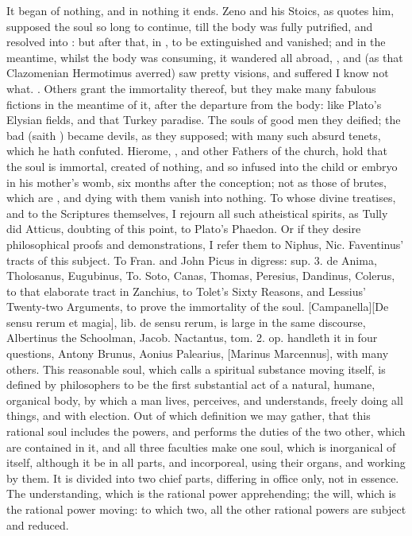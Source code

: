 {It began of nothing, and in nothing it ends. Zeno and his Stoics, as
\Austin{} quotes him, supposed the soul so long to continue, till
the body was fully putrified, and resolved into : but
after that, in , to be extinguished and vanished; and
in the meantime, whilst the body was consuming, it wandered all abroad,
, and (as that Clazomenian Hermotimus
averred) saw pretty visions, and suffered I know not what. .
Others grant the immortality thereof, but they make many fabulous
fictions in the meantime of it, after the departure from the body: like
Plato's Elysian fields, and that Turkey paradise. The souls of good men
they deified; the bad (saith \Austin{}) became devils, as they
supposed; with many such absurd tenets, which he hath confuted.
Hierome, \Austin{}, and other Fathers of the church, hold that the soul is
immortal, created of nothing, and so infused into the child or embryo
in his mother's womb, six months after the conception; not as
those of brutes, which are , and dying with them vanish into
nothing. To whose divine treatises, and to the Scriptures themselves, I
rejourn all such atheistical spirits, as Tully did Atticus, doubting of
this point, to Plato's Phaedon. Or if they desire philosophical proofs
and demonstrations, I refer them to Niphus, Nic. Faventinus' tracts of
this subject. To Fran. and John Picus in digress: sup. 3. de Anima,
Tholosanus, Eugubinus, To. Soto, Canas, Thomas, Peresius, Dandinus,
Colerus, to that elaborate tract in Zanchius, to Tolet's Sixty Reasons,
and Lessius' Twenty-two Arguments, to prove the immortality of the
soul. [Campanella][\textlatin{De sensu rerum et magia}], lib. de sensu rerum, is large in the same discourse,
Albertinus the Schoolman, Jacob. Nactantus, tom. 2. op. handleth it in
four questions, Antony Brunus, Aonius Palearius, [Marinus Marcennus],
with many others. This reasonable soul, which \Austin{} calls a spiritual
substance moving itself, is defined by philosophers to be the first
substantial act of a natural, humane, organical body, by which a man
lives, perceives, and understands, freely doing all things, and with
election. Out of which definition we may gather, that this rational
soul includes the powers, and performs the duties of the two other,
which are contained in it, and all three faculties make one soul, which
is inorganical of itself, although it be in all parts, and incorporeal,
using their organs, and working by them. It is divided into two chief
parts, differing in office only, not in essence. The understanding,
which is the rational power apprehending; the will, which is the
rational power moving: to which two, all the other rational powers are
subject and reduced.

}
